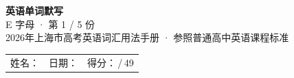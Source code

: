 \documentclass[10pt,a4paper]{article}
\begin{document}
\pagestyle{plain}

\begin{center}
{\LARGE\bfseries 英语单词默写}\\[0.22em]
{\large E 字母 · 第 1 / 5 份}\\[0.18em]
{\small 2026年上海市高考英语词汇用法手册 · 参照普通高中英语课程标准}
\end{center}

\vspace{0.25em}
\noindent\begin{tabular}{@{}p{}@{}p{}@{}p{}@{}}
姓名：\underline{\hspace{2.0cm}} & 日期：\underline{\hspace{2.0cm}} & 得分：\underline{\hspace{1.3cm}}\,/\,49 \\
\end{tabular}

\vspace{0.3em}

\vspace{0.08em}
\end{document}
